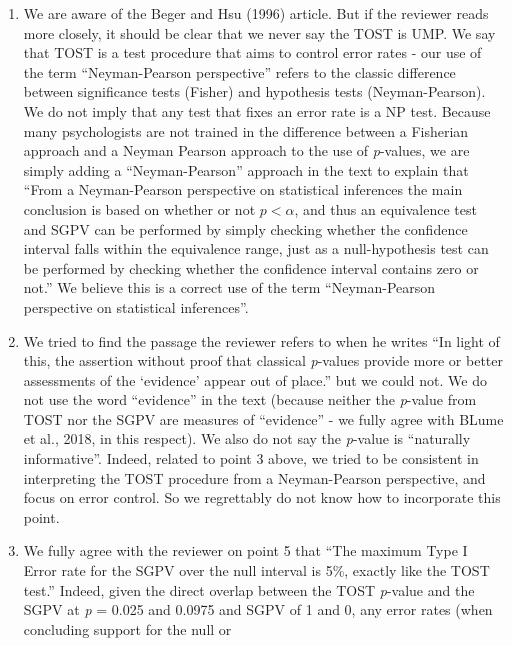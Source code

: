 \documentclass[man]{apa6}
\begin{document}
\begin{enumerate}
\def\labelenumi{\arabic{enumi}.}
\setcounter{enumi}{2}
\item
  We are aware of the Beger and Hsu (1996) article. But if the reviewer
  reads more closely, it should be clear that we never say the TOST is
  UMP. We say that TOST is a test procedure that aims to control error
  rates - our use of the term \enquote{Neyman-Pearson perspective}
  refers to the classic difference between significance tests (Fisher)
  and hypothesis tests (Neyman-Pearson). We do not imply that any test
  that fixes an error rate is a NP test. Because many psychologists are
  not trained in the difference between a Fisherian approach and a
  Neyman Pearson approach to the use of \emph{p}-values, we are simply
  adding a \enquote{Neyman-Pearson} approach in the text to explain that
  \enquote{From a Neyman-Pearson perspective on statistical inferences
  the main conclusion is based on whether or not \(p < \alpha\), and
  thus an equivalence test and SGPV can be performed by simply checking
  whether the confidence interval falls within the equivalence range,
  just as a null-hypothesis test can be performed by checking whether
  the confidence interval contains zero or not.} We believe this is a
  correct use of the term \enquote{Neyman-Pearson perspective on
  statistical inferences}.
\item
  We tried to find the passage the reviewer refers to when he writes
  \enquote{In light of this, the assertion without proof that classical
  \emph{p}-values provide more or better assessments of the
  \enquote{evidence} appear out of place.} but we could not. We do not
  use the word \enquote{evidence} in the text (because neither the
  \emph{p}-value from TOST nor the SGPV are measures of
  \enquote{evidence} - we fully agree with BLume et al., 2018, in this
  respect). We also do not say the \emph{p}-value is \enquote{naturally
  informative}. Indeed, related to point 3 above, we tried to be
  consistent in interpreting the TOST procedure from a Neyman-Pearson
  perspective, and focus on error control. So we regrettably do not know
  how to incorporate this point.
\item
  We fully agree with the reviewer on point 5 that \enquote{The maximum
  Type I Error rate for the SGPV over the null interval is 5\%, exactly
  like the TOST test.} Indeed, given the direct overlap between the TOST
  \emph{p}-value and the SGPV at \emph{p} = 0.025 and 0.0975 and SGPV of
  1 and 0, any error rates (when concluding support for the null or

\end{enumerate}
\end{document}
